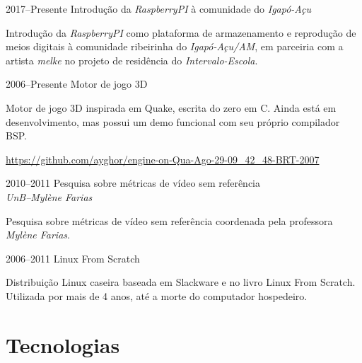 \documentclass[a4paper,twoside]{simplecv}
\begin{document}
\begin{topic}
%
%
%
\item[2017--Presente] Introdução da \emph{RaspberryPI} à comunidade do \emph{Igapó-Açu}

	Introdução da \emph{RaspberryPI} como plataforma de armazenamento e
	reprodução de meios digitais à comunidade ribeirinha do
	\emph{Igapó-Açu/AM}, em parceiria com a artista \emph{melke} no projeto
	de residência do \emph{Intervalo-Escola}.

\item[2006--Presente] Motor de jogo 3D

	Motor de jogo 3D inspirada em Quake, escrita do zero em C. Ainda está
	em desenvolvimento, mas possui um demo funcional com seu próprio
	compilador BSP.

	{\scriptsize\url{https://github.com/ayghor/engine-on-Qua-Ago-29-09\_42\_48-BRT-2007}}

\item[2010--2011] Pesquisa sobre métricas de vídeo sem referência\\
	{\em\small UnB--Mylène Farias}

	Pesquisa sobre métricas de vídeo sem referência coordenada pela
	professora \emph{Mylène Farias}.

\item[2006--2011] Linux From Scratch

	Distribuição Linux caseira baseada em Slackware e no livro Linux
	From Scratch. Utilizada por mais de 4 anos, até a morte do
	computador hospedeiro.

\end{topic}

\section{Tecnologias}
\end{document}
